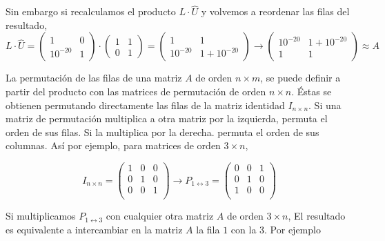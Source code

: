 Sin embargo si recalculamos el producto $L\cdot \hat{U}$ y volvemos a reordenar las filas del resultado,
\begin{equation*}
L \cdot \hat{U}=  \begin{pmatrix}
1& 0\\
10^{-20}& 1 
\end{pmatrix} \cdot \begin{pmatrix}
1& 1\\
0& 1 
\end{pmatrix}= \begin{pmatrix}
1& 1\\
10^{-20}& 1+10^{-20}
\end{pmatrix} \rightarrow \begin{pmatrix}
10^{-20}& 1+10^{-20}\\
1& 1
\end{pmatrix} \approx A
\end{equation*}

La permutación de las filas de una matriz $A$ de orden $n\times m$, se puede definir a partir del producto con las matrices de permutación de orden $n \times n$. Éstas se obtienen permutando directamente las filas de la matriz identidad $I_{n \times n}$. Si una matriz de permutación multiplica a otra matriz por la izquierda, permuta el orden de sus filas. Si la multiplica por la derecha. permuta el orden de sus columnas. Así por ejemplo, para matrices de orden $3 \times n$,

\begin{equation*}
I_{n \times n}=\begin{pmatrix}
1& 0& 0\\
0& 1& 0\\
0& 0& 1\\
\end{pmatrix} \rightarrow P_{1 \leftrightarrow 3}= \begin{pmatrix}
0& 0& 1\\
0& 1& 0\\
1& 0& 0\\
\end{pmatrix}
\end{equation*}

Si multiplicamos $P_{1 \leftrightarrow 3}$ con cualquier otra matriz $A$ de orden $3\times n$, El resultado es equivalente a intercambiar en la matriz $A$ la fila $1$ con la $3$. Por ejemplo
   
